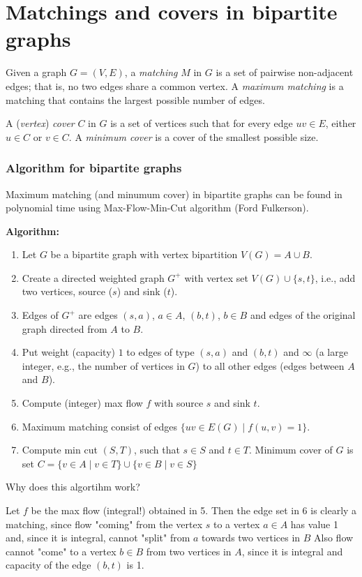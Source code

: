 \chapter{Matchings and covers in bipartite graphs}

Given a graph $G = (V,E)$, a \emph{matching} $M$ in $G$ is a set of pairwise non-adjacent edges; that is, no two edges share a common vertex. A \emph{maximum matching} is a matching that contains the largest possible number of edges.

A (\emph{vertex}) \emph{cover} $C$ in $G$ is a set of vertices such that for every edge $uv \in E$, either $u \in C$ or $v \in C$. A \emph{minimum cover} is a cover of the smallest possible size.

\subsection*{Algorithm for bipartite graphs}

Maximum matching (and minumum cover) in bipartite graphs can be found in polynomial time using Max-Flow-Min-Cut algorithm (Ford Fulkerson).

\medskip
\noindent \textbf{Algorithm:}
\begin{enumerate}
\item Let $G$ be a bipartite graph with vertex bipartition $V(G) = A \cup B$.
\item Create a directed weighted graph $G^+$ with vertex set $V(G) \cup \{s, t\}$, i.e., add two vertices, source ($s$) and sink ($t$).
\item Edges of $G^+$ are edges $(s, a)$, $a \in A$, $(b, t)$, $b \in B$ and edges of the original graph directed from $A$ to $B$.
\item Put weight (capacity) $1$ to edges of type $(s, a)$ and $(b, t)$ and $\infty$ (a large integer, e.g., the number of vertices in $G$) to all other edges (edges between $A$ and $B$).
\item Compute (integer) max flow $f$ with source $s$ and sink $t$.
\item Maximum matching consist of edges $\{uv \in E(G) \mid f(u, v) = 1\}$.
\item Compute min cut $(S, T)$, such that $s \in S$ and $t \in T$.  Minimum cover of $G$ is set $C = \{v \in A \mid v \in T\} \cup \{v \in B \mid v \in S\}$
\end{enumerate}

\medskip
\noindent Why does this algortihm work?

\medskip
Let $f$ be the max flow (integral!) obtained in 5. Then the edge set in 6 is clearly a matching, since flow "coming" from the vertex $s$ to a vertex $a \in A$ has value 1 and, since it is integral, cannot "split" from $a$ towards two vertices in $B$ Also flow cannot "come" to a vertex $b \in B$ from two vertices in $A$, since it is integral and capacity of the edge $(b, t)$ is 1.

